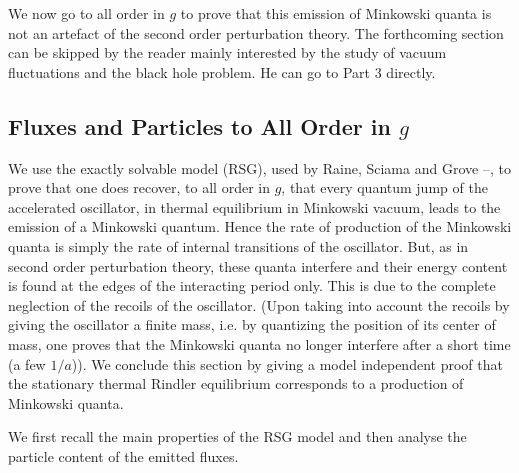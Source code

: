 \documentclass[12pt]{article}
\begin{document}
We now go to all order in $g$ to prove that
this emission of Minkowski quanta is not an artefact of the second
order perturbation theory.
The forthcoming section can be skipped by the reader mainly interested by the
study of vacuum fluctuations and the black hole problem. He can
go to
Part 3 directly.

\subsection{Fluxes and Particles to All Order in $g$}\label{allg}

  We use the exactly solvable model (RSG), used by Raine, Sciama and Grove
\cite{RSG}--\cite{mpbrsg},
to prove that one does recover, to all
order in $g$, that every quantum jump of the
accelerated oscillator, in thermal equilibrium in Minkowski vacuum,
leads to the emission of a Minkowski quantum. Hence the rate of
production of the Minkowski quanta is simply the rate of internal
transitions of the oscillator. But, as in second order perturbation
theory, these quanta interfere
and their
energy
content is found
 at the edges of the interacting period
only. This is due to the complete neglection of the recoils of the oscillator.
(Upon taking into account the recoils by giving the oscillator a finite
mass, i.e. by quantizing the position of its center of mass,
one proves that the  Minkowski quanta
no longer interfere after a short time (a few $1/a$)\cite{Par}). We conclude
this section by giving a model independent proof that the
stationary thermal Rindler equilibrium corresponds to a
production of Minkowski quanta.

We first recall the main properties of the RSG model and then
analyse the particle content of
the emitted fluxes.
\end{document}
